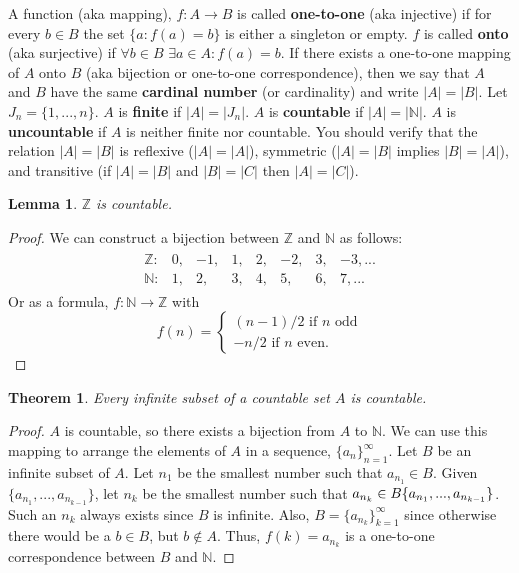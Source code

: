 \documentclass[12pt,reqno]{amsart}
\newtheorem{theorem}{Theorem}[section]
\newtheorem{lemma}{Lemma}[section]
\theoremstyle{definition}
\begin{document}
A function (aka mapping), $f:A \rightarrow B$ is called
\textbf{one-to-one} (aka injective) if for every $b \in B$ the set
$\{a: f(a) = b \}$ is either a singleton or empty. $f$ is called
\textbf{onto} (aka surjective) if $\forall b \in B$ $\exists a \in A:
f(a) = b$.  If there exists a one-to-one mapping of $A$ onto $B$ (aka
bijection or one-to-one correspondence), then we say that $A$ and $B$
have the same \textbf{cardinal number} (or cardinality) and write $|A|
= |B|$.  Let $J_n = \{1, ..., n \}$. $A$ is \textbf{finite} if $|A| =
|J_n|$.  $A$ is \textbf{countable} if $|A| = |\mathbb{N}|$. $A$ is
\textbf{uncountable} if $A$ is neither finite nor countable.  You
should verify that the relation $|A| = |B|$ is reflexive ($|A| =
|A|$), symmetric ($|A| = |B|$ implies $|B| = |A|$), and transitive (if
$|A| = |B|$ and $|B| = |C|$ then $|A| = |C|$). 

\begin{lemma}
  $\mathbb{Z}$ is countable. 
\end{lemma}
\begin{proof}
  We can construct a bijection between $\mathbb{Z}$ and $\mathbb{N}$
  as follows:
  \begin{align*}
    \begin{matrix}
      \mathbb{Z}: & 0, & -1, & 1, & 2, & -2, & 3, & -3, ... \\
      \mathbb{N}: & 1, & 2, & 3, & 4, & 5, & 6, & 7,  ...
    \end{matrix}
  \end{align*}
  Or as a formula, $f:\mathbb{N} \rightarrow \mathbb{Z}$ with 
  \[ f(n) = \begin{cases} (n-1)/2 \text{ if } n \text{ odd} \\
    -n/2 \text{ if } n \text{ even}. \end{cases} \]  
\end{proof}

\begin{theorem} \label{thm:countsubset}
  Every infinite subset of a countable set $A$ is countable.
\end{theorem}
\begin{proof}
  $A$ is countable, so there exists a bijection from $A$ to
  $\mathbb{N}$. We can use this mapping to arrange the elements of $A$
  in a sequence, $\{a_{n}\}^\infty_{n=1}$. Let $B$ be an infinite
  subset of $A$. Let $n_1$ be the smallest number such that $a_{n_1}
  \in B$. Given $\{a_{n_1}, ... , a_{n_{k-1}}\}$, let $n_k$ be the
  smallest number such that $a_{n_k} \in B \\ \{a_{n_1}, ... ,
  a_{n_{k-1}}\}$. Such an $n_k$ always exists since $B$ is
  infinite. Also, $B = \{a_{n_k} \}_{k=1}^\infty$ since otherwise
  there would be a $b \in B$, but $b\not\in A$. Thus, $f(k) = a_{n_k}$ is
  a one-to-one correspondence between $B$ and $\mathbb{N}$.
\end{proof}
\end{document}
